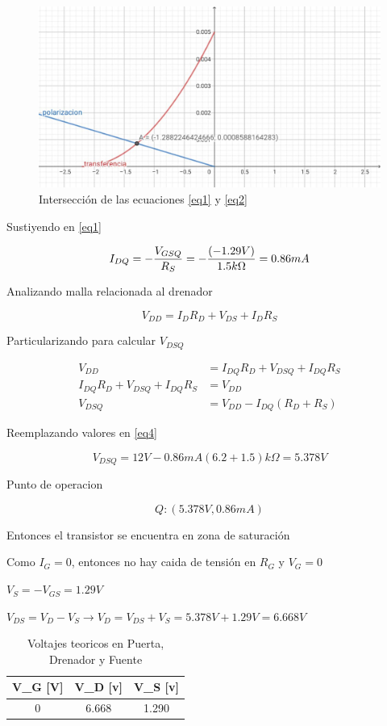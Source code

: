 \documentclass[12pt, a4paper]{article}
\begin{document}
    \begin{figure}[h!]
        \centering
        \includegraphics[height=5cm\textwidth]{graficoQ.jpg}
        \caption{Intersección de las ecuaciones \eqref{eq1} y \eqref{eq2}}
        \label{fig:vgsq}
    \end{figure}

    Sustiyendo en \eqref{eq1}

    $$I_{DQ} = -{V_{GSQ} \over R_S} = -{(-1.29V) \over 1.5k\Omega} = 0.86mA$$

    Analizando malla relacionada al drenador

    $$V_{DD} = I_DR_D + V_{DS} + I_DR_S$$

    Particularizando para calcular $V_{DSQ}$

    \begin{equation}
        \label{eq4}
        \begin{split}
            V_{DD} & = I_{DQ}R_D + V_{DSQ} + I_{DQ}R_S \\
            I_{DQ}R_D + V_{DSQ} + I_{DQ}R_S & = V_{DD} \\
            V_{DSQ} & = V_{DD} - I_{DQ}(R_D + R_S)
        \end{split}
    \end{equation}
    
    Reemplazando valores en \eqref{eq4}

    $$V_{DSQ} = 12V - 0.86mA(6.2 + 1.5)k\Omega = 5.378V$$

    Punto de operacion

    $$Q : (5.378V, 0.86mA)$$

    Entonces el transistor se encuentra en zona de saturación
    
    Como $I_G = 0$, entonces no hay caida de tensión en $R_G$ y $V_G = 0$

    $V_S = - V_{GS} = 1.29V$

    $V_{DS} = V_D - V_S \rightarrow V_D = V_{DS} + V_S = 5.378V + 1.29V = 6.668V$

    \begin{table}[h!]
        \centering
        \caption{Voltajes teoricos en Puerta, Drenador y Fuente}
        \label{tab:vteorico} 
        \begin{tabular}{|c|c|c|} \hline
            V_G [V] & V_D [v] & V_S [v] \\ \hline
            0 & 6.668 & 1.290 \\ \hline
        \end{tabular}
    \end{table}
\end{document}
